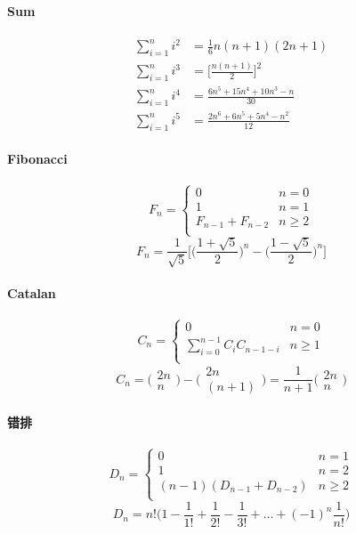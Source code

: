 \paragraph{Sum}
\begin{align*}
	\sum_{i=1}^n i^2 &= \frac{1}{6}n(n+1)(2n+1) \\
	\sum_{i=1}^n i^3 &= \Big[\frac{n(n+1)}{2}\Big]^2 \\
	\sum_{i=1}^n i^4 &= \frac{6n^5+15n^4+10n^3-n}{30} \\
	\sum_{i=1}^n i^5 &= \frac{2n^6+6n^5+5n^4-n^2}{12} 
\end{align*}

\paragraph{Fibonacci}
\[ F_n=\begin{cases}
	0 & n=0 \\
	1 & n=1 \\
	F_{n-1}+F_{n-2} & n \geq 2 \\
\end{cases} \]
\[ F_n=\frac{1}{\sqrt{5}}\Big[\Big(\frac{1+\sqrt{5}}{2}\Big)^n-\Big(\frac{1-\sqrt{5}}{2}\Big)^n\Big] \]

\paragraph{Catalan}
\[ C_n=\begin{cases}
	0 & n=0 \\
	\sum\limits_{i=0}^{n-1} C_i C_{n-1-i} & n \geq 1 \\
\end{cases} \]
\[ C_n= \Big(\begin{array}{c} 2n\\n \end{array} \Big) - \Big(\begin{array}{c} 2n\\(n+1) \end{array} \Big) = \frac{1}{n+1}\Big(\begin{array}{c} 2n\\n \end{array} \Big) \]

\paragraph{错排}
\[ D_n=\begin{cases}
	0 & n=1 \\
	1 & n=2 \\
	(n-1)(D_{n-1}+D_{n-2}) & n \geq 2 \\
\end{cases} \]
\[ D_n=n!\Big(1-\frac{1}{1!}+\frac{1}{2!}-\frac{1}{3!}+ \dots +(-1)^n\frac{1}{n!} \Big) \]

